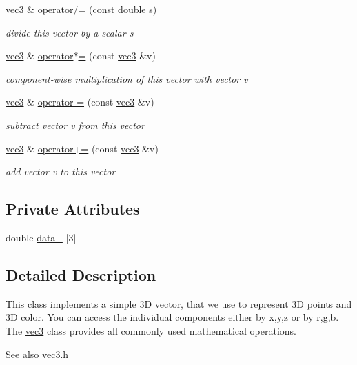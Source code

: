 \begin{DoxyCompactItemize}
\hyperlink{classvec3}{vec3} \& \hyperlink{classvec3_a12590c923f5839bc9727466fa39b7aa3}{operator/=} (const double s)
\begin{DoxyCompactList}\small\item\em divide this vector by a scalar {\ttfamily s} \end{DoxyCompactList}\item 
\hyperlink{classvec3}{vec3} \& \hyperlink{classvec3_af48643b0cc8c7065df1dd001c50b55a3}{operator$\ast$=} (const \hyperlink{classvec3}{vec3} \&v)
\begin{DoxyCompactList}\small\item\em component-\/wise multiplication of this vector with vector {\ttfamily v} \end{DoxyCompactList}\item 
\hyperlink{classvec3}{vec3} \& \hyperlink{classvec3_aae14957b5530407e22095bfadcb98611}{operator-\/=} (const \hyperlink{classvec3}{vec3} \&v)
\begin{DoxyCompactList}\small\item\em subtract vector {\ttfamily v} from this vector \end{DoxyCompactList}\item 
\hyperlink{classvec3}{vec3} \& \hyperlink{classvec3_a68fcdd8a705437648ee8d3a1e74f6165}{operator+=} (const \hyperlink{classvec3}{vec3} \&v)
\begin{DoxyCompactList}\small\item\em add vector {\ttfamily v} to this vector \end{DoxyCompactList}\end{DoxyCompactItemize}
\subsection*{Private Attributes}
\begin{DoxyCompactItemize}
\item 
double \hyperlink{classvec3_a3870ed34c802775320f2a3c0739693e4}{data\+\_\+} \mbox{[}3\mbox{]}
\end{DoxyCompactItemize}


\subsection{Detailed Description}
This class implements a simple 3D vector, that we use to represent 3D points and 3D color. You can access the individual components either by x,y,z or by r,g,b. The \hyperlink{classvec3}{vec3} class provides all commonly used mathematical operations. \begin{DoxySeeAlso}{See also}
\hyperlink{vec3_8h}{vec3.\+h} 
\end{DoxySeeAlso}


